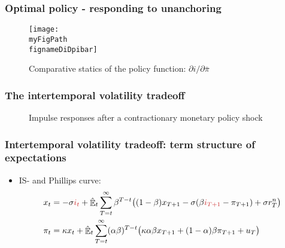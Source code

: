 \documentclass[10pt]{beamer}
\def \myFigPath {../../../figures/}
\DeclareMathOperator{\E}{\mathbb{E}}
\def\mySmallFigScale{0.25}
\def\myTinyFigScale{0.16}
\def\fignameDiDpibar{analyze_opt_policy_ip27_Aug_2020}
\def\fignamePEAobsTR{implement_anchTC_obs_TR_approx27_Aug_2020}
\def\fignamePEAobsAnch{implement_anchTC_obs_approx27_Aug_2020_16_21_47}
\def\fignameIRFanchored{command_IFS_anchoring_pretty_RIR_LH_anch_monpol_again_critCUSUM_constant_only_T_400_N_1000_burnin_5_params_psi_pi_1_5_psi_x_0_gbar_0_145_thetbar_16_thettilde_2_5_kap_0_8_lamx_0_lami_0_date_2020_06_05}
\def\fignameIRFunanchored{command_IFS_anchoring_pretty_RIR_LH_unanch_monpol_again_critCUSUM_constant_only_T_400_N_1000_burnin_5_params_psi_pi_1_5_psi_x_0_gbar_0_145_thetbar_16_thettilde_2_5_kap_0_8_lamx_0_lami_0_date_2020_06_05}
\begin{document}

\begin{frame}
	\frametitle{Optimal policy - responding to unanchoring }
	
\begin{figure}[h!]
\texttt{[image: \\myFigPath \\fignameDiDpibar]}
\caption{Comparative statics of the policy function: $\partial i / \partial \bar{\pi}$}
\end{figure} 

\end{frame}

%	
%

\begin{frame}
	\frametitle{The intertemporal volatility tradeoff}

\begin{figure}[h!]
\caption{Impulse responses after a contractionary monetary policy shock}
\label{IRF}
\end{figure}	

\end{frame}

\begin{frame}
	\frametitle{Intertemporal volatility tradeoff: term structure of expectations}
\begin{itemize}
\item[] IS- and Phillips curve:	
 \begin{align*}
x_t &=  -\sigma \textcolor{brownreddark}{i_t} +\hat{\E}_t \sum_{T=t}^{\infty} \beta^{T-t }\big( (1-\beta)x_{T+1} - \sigma(\beta \textcolor{brownreddark}{i_{T+1}} - \pi_{T+1}) +\sigma r_T^n \big)   \\
\pi_t &= \kappa x_t +\hat{\E}_t \sum_{T=t}^{\infty} (\alpha\beta)^{T-t }\big( \kappa \alpha \beta x_{T+1} + (1-\alpha)\beta \pi_{T+1} + u_T\big) 
\end{align*}


\end{itemize}



\end{frame}
\end{document}
